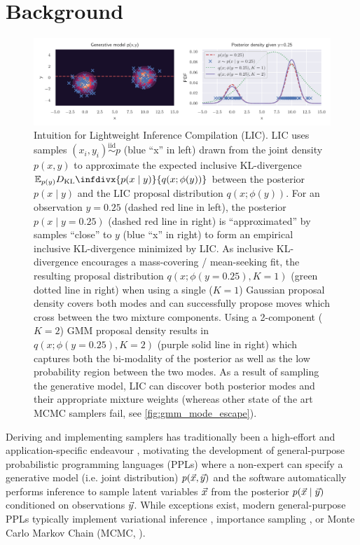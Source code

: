\documentclass[thesis.tex]{subfiles}
\begin{document}
\section{Background}

\begin{figure}
  \centering
  \includegraphics[width=\linewidth]{Figures/intuition.pdf}
  \caption{
    Intuition for Lightweight Inference Compilation (LIC).
    LIC uses samples $(x_i, y_i) \overset{\text{iid}}{\sim} p$ (blue ``x'' in left)
    drawn from the joint density $p(x, y)$ to approximate the expected inclusive KL-divergence
    $\bE_{p(y)} D_{\text{KL}}\infdivx{p(x \mid y)}{q(x; \phi(y))}$
    between the posterior $p(x \mid y)$ and the LIC proposal distribution
    $q(x ; \phi(y))$. For an observation $y=0.25$ (dashed red line in left),
    the posterior $p(x \mid y=0.25)$ (dashed red line in right) is ``approximated''
    by samples ``close'' to $y$ (blue ``x'' in right) to form an empirical
    inclusive KL-divergence minimized by LIC. As inclusive KL-divergence
    encourages a mass-covering / mean-seeking fit, the resulting proposal
    distribution $q(x;\phi(y=0.25), K=1)$ (green dotted line in right)
    when using a single ($K=1$) Gaussian proposal density covers both modes
    and can successfully propose moves which cross between the two mixture
    components. Using a 2-component ($K=2$) GMM proposal density results in
    $q(x;\phi(y=0.25), K=2)$ (purple solid line in right) which captures both the
    bi-modality of the posterior as well as the low probability region between
    the two modes.
    As a result of sampling the generative model, LIC can discover
    both posterior modes and their appropriate mixture weights
    (whereas other state of the art MCMC samplers fail, see \cref{fig:gmm_mode_escape}).
  }\label{fig:intuition}
\end{figure}


Deriving and implementing samplers has traditionally been a high-effort and
application-specific endeavour \citep{porteous2008fast,murray2010elliptical},
motivating the development of general-purpose probabilistic programming
languages (PPLs) where a non-expert can specify a generative model (i.e.
joint distribution) $p(\vec{x}, \vec{y})$ and the software automatically performs
inference to sample latent variables $\vec{x}$ from the posterior $p(\vec{x} \mid
  \vec{y})$ conditioned on observations $\vec{y}$. While exceptions exist,
modern general-purpose PPLs typically implement variational inference
\citep{bingham2019pyro}, importance sampling
\citep{wood2014new,le2017inference}, or Monte Carlo Markov Chain (MCMC,
\cite{wingate2011lightweight,tehrani2020beanmachine}).
\end{document}
